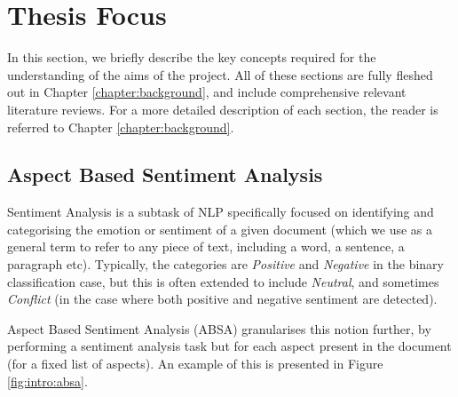 \section{Thesis Focus} \label{section:intro:projectfocus}
In this section, we briefly describe the key concepts required for the understanding of the aims of the project. All of these sections are fully fleshed out in Chapter \ref{chapter:background}, and include comprehensive relevant literature reviews. For a more detailed description of each section, the reader is referred to Chapter \ref{chapter:background}.

\subsection{Aspect Based Sentiment Analysis} \label{section:intro:absa}
Sentiment Analysis is a subtask of NLP specifically focused on identifying and categorising the emotion or sentiment of a given document (which we use as a general term to refer to any piece of text, including a word, a sentence, a paragraph etc). Typically, the categories are \textit{Positive} and \textit{Negative} in the binary classification case, but this is often extended to include \textit{Neutral}, and sometimes \textit{Conflict} (in the case where both positive and negative sentiment are detected).

Aspect Based Sentiment Analysis (ABSA) granularises this notion further, by performing a sentiment analysis task but for each aspect present in the document (for a fixed list of aspects). An example of this is presented in Figure \ref{fig:intro:absa}.

